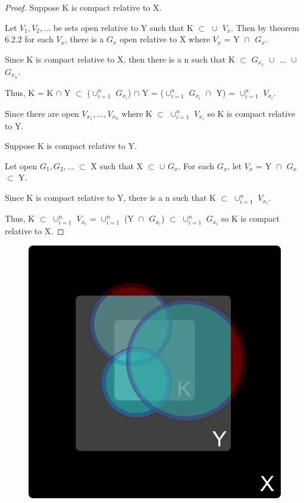 	\begin{proof}
		Suppose K is compact relative to X.

		Let $V_1, V_2, ...$ be sets open relative to Y such that
		K $\subset$ $\cup_{}^{}$ $V_x$.
		Then by {\color{red} theorem 6.2.2} for each $V_x$, there is a
		$G_x$ open relative to X where $V_x$ = Y $\cap_{}^{}$ $G_x$.

		Since K is compact relative to X, then there is a n such that
		K $\subset$ $G_{x_1}$ $\cup_{}^{}$ ... $\cup_{}^{}$ $G_{x_n}$.

		Thus, K = K $\cap$ Y $\subset$ ($\cup_{i=1}^{n}$ $G_{x_i}$) $\cap$ Y
		= ($\cup_{i=1}^{n}$ $G_{x_i}$ $\cap_{}^{}$ Y) = $\cup_{i=1}^{n}$ $V_{x_i}$.
		
		Since there are open $V_{x_1}, ... , V_{x_n}$ where
		K $\subset$ $\cup_{i=1}^{n}$ $V_{x_i}$ so K is compact relative to Y.

		Suppose K is compact relative to Y.

		Let open $G_1, G_2, ...$ $\subset$ X such that X $\subset$ $\cup$ $G_x$.
		For each $G_x$, let $V_x$ = Y $\cap_{}^{}$ $G_x$ $\subset$ Y.

		Since K is compact relative to Y, there is a n such that
		K $\subset$ $\cup_{i=1}^{n}$ $V_{x_i}$.

		Thus, K $\subset$ $\cup_{i=1}^{n}$ $V_{x_i}$
		= $\cup_{i=1}^{n}$ (Y $\cap_{}^{}$ $G_{x_i}$)
		$\subset$ $\cup_{i=1}^{n}$ $G_{x_i}$ so K is compact relative to X.
	\end{proof}



	\begin{figure}[h]
		\centering
		\includegraphics[scale=0.3]{Images/6.3.3.png}
	\end{figure}

